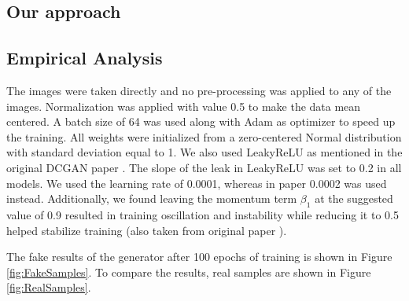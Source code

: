\subsection{Our approach}


\subsection{Empirical Analysis}

The images were taken directly and no pre-processing was applied to any of the images. Normalization was applied with value 0.5 to make the data mean centered. A batch size of 64 was used along with Adam \citep{kingma2014adam} as optimizer to speed up the training. All weights were initialized from a zero-centered Normal distribution with standard deviation equal to 1. We also used LeakyReLU as mentioned in the original DCGAN paper \cite{DBLP:journals/corr/RadfordMC15}. The slope of the leak in LeakyReLU was set to 0.2 in all models. We used the learning rate of 0.0001, whereas in paper 0.0002 was used instead. Additionally, we found leaving the momentum term $\beta_1$ at the suggested value of 0.9 resulted in training oscillation and instability while reducing it to 0.5 helped stabilize training (also taken from original paper \cite{DBLP:journals/corr/RadfordMC15}).

The fake results of the generator after 100 epochs of training is shown in Figure \ref{fig:FakeSamples}. To compare the results, real samples are shown in Figure \ref{fig:RealSamples}.  

